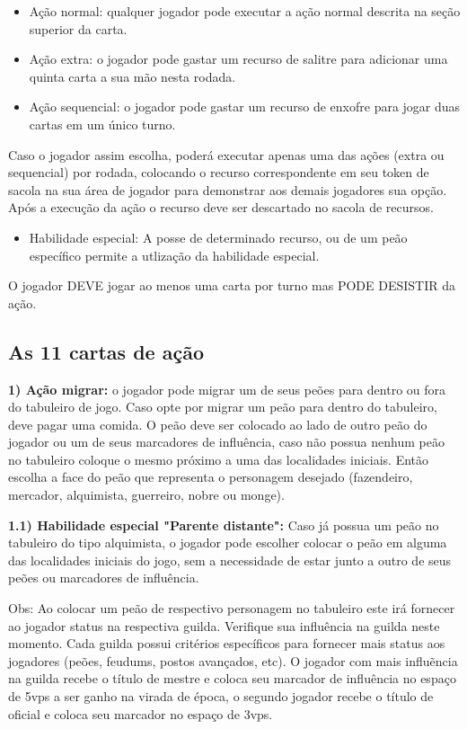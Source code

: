 \documentclass[11pt]{article}
\begin{document}
\begin{itemize}
\item Ação normal: qualquer jogador pode executar a ação normal descrita na seção superior da carta.
\item Ação extra: o jogador pode gastar um recurso de salitre para adicionar uma quinta carta a sua mão nesta rodada.
\item Ação sequencial: o jogador pode gastar um recurso de enxofre para jogar duas cartas em um único turno.
\end{itemize}

Caso o jogador assim escolha, poderá executar apenas uma das ações (extra ou sequencial) por rodada, colocando o recurso correspondente em seu token de sacola na sua área de jogador
para demonstrar aos demais jogadores sua opção.
Após a execução da ação o recurso deve ser descartado no sacola de recursos.

\begin{itemize}
\item Habilidade especial: A posse de determinado recurso, ou de um peão específico permite a utlização da habilidade especial.
\end{itemize}

O jogador DEVE jogar ao menos uma carta por turno mas PODE DESISTIR da ação.

\subsection{As 11 cartas de ação}
\label{sec-6-1}


\textbf{1) Ação migrar:} o jogador pode migrar um de seus peões para dentro ou fora do tabuleiro de jogo. Caso opte por migrar um peão para dentro do tabuleiro, deve pagar uma comida.
O peão deve ser colocado ao lado de outro peão do jogador ou um de seus marcadores de influência, caso não possua nenhum peão no tabuleiro coloque o mesmo próximo a uma das localidades
iniciais. Então escolha a face do peão que representa o personagem desejado (fazendeiro, mercador, alquimista, guerreiro, nobre ou monge).

\textbf{1.1) Habilidade especial "Parente distante":} Caso já possua um peão no tabuleiro do tipo alquimista, o jogador pode escolher colocar o peão em alguma das localidades iniciais do jogo,
sem a necessidade de estar junto a outro de seus peões ou marcadores de influência.

Obs: Ao colocar um peão de respectivo personagem no tabuleiro este irá fornecer ao jogador status na respectiva guilda. Verifique sua influência na guilda neste momento. Cada guilda possui critérios
específicos para fornecer mais status aos jogadores (peões, feudums, postos avançados, etc). O jogador com mais influẽncia na guilda recebe o título de mestre e coloca seu marcador de influência
no espaço de 5vps a ser ganho na virada de época, o segundo jogador recebe o título de oficial e coloca seu marcador no espaço de 3vps.
\end{document}
